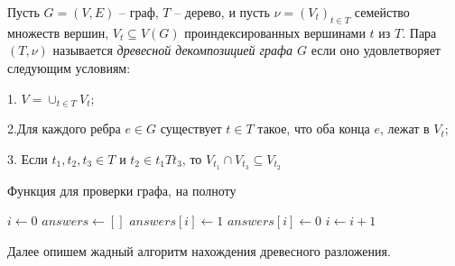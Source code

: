 
Пусть $G=(V, E)$ -- граф, $T$ -- дерево, и пусть $\nu = (V_t)_{t \in T}$ семейство множеств вершин, $V_t \subseteq V(G)$ проиндексированных вершинами $t$ из $T$.
Пара $(T, \nu)$ называется {\it древесной декомпозицией графа $G$} если оно удовлетворяет следующим условиям:

1. $V = \cup_{t \in T} V_t$;

2.Для каждого ребра $e \in G$ существует $t \in T$ такое, что оба конца $e$, лежат в $V_t$;

3. Если $t_1, t_2, t_3 \in T$ и $t_2 \in t_{1}Tt_{3}$, то $V_{t_1} \cap V_{t_3} \subseteq V_{t_2}$




\begin{algorithm}
    \caption{Функция для проверки графа, на полноту}\label{Функция}
    \begin{algorithmic}[1]
          \State $i \gets 0$
          \State $answers \gets []$
                  \State $answers[i] \gets 1$
              \Else
                  \State $answers[i] \gets 0$
              \EndIf
              \State $i \gets i+1$
            \EndFor

              \EndIf
          \EndFor

          \EndProcedure
  \end{algorithmic}
  \end{algorithm}

  Далее опишем жадный алгоритм нахождения древесного разложения.
  
